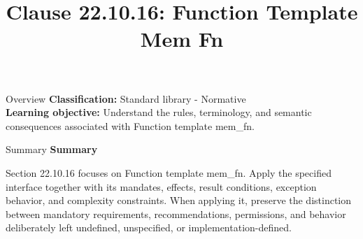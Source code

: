 \documentclass[10pt,letterpaper]{article}
\title{Clause 22.10.16: Function Template Mem Fn}
\author{}
\date{}
\begin{document}
\maketitle
\begin{CornellOverviewBox}{Overview}
\textbf{Classification:} Standard library - Normative\\[2pt]
\textbf{Learning objective:} Understand the rules, terminology, and semantic consequences associated with Function template mem\_fn.
\end{CornellOverviewBox}\begin{CornellSummaryBox}{Summary}
{\sffamily\bfseries\color{Accent} Summary}\par\vspace{3pt}Section 22.10.16 focuses on Function template mem\_fn. Apply the specified interface together with its mandates, effects, result conditions, exception behavior, and complexity constraints. When applying it, preserve the distinction between mandatory requirements, recommendations, permissions, and behavior deliberately left undefined, unspecified, or implementation-defined.
\end{CornellSummaryBox}
\end{document}
